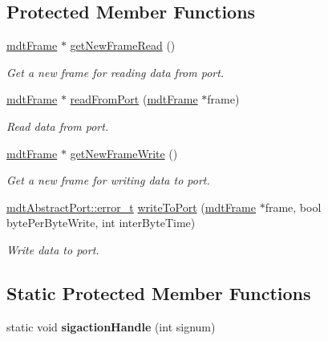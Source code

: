 \subsection*{Protected Member Functions}
\begin{DoxyCompactItemize}
\item 
\hyperlink{classmdt_frame}{mdtFrame} $\ast$ \hyperlink{classmdt_port_thread_a611211e56620ec9c699019452716e4fc}{getNewFrameRead} ()
\begin{DoxyCompactList}\small\item\em Get a new frame for reading data from port. \end{DoxyCompactList}\item 
\hyperlink{classmdt_frame}{mdtFrame} $\ast$ \hyperlink{classmdt_port_thread_a7e6e152839e35b8fbd1eb299c1d0b2fe}{readFromPort} (\hyperlink{classmdt_frame}{mdtFrame} $\ast$frame)
\begin{DoxyCompactList}\small\item\em Read data from port. \end{DoxyCompactList}\item 
\hyperlink{classmdt_frame}{mdtFrame} $\ast$ \hyperlink{classmdt_port_thread_acba4fce38a633da68ec23fe191ba6105}{getNewFrameWrite} ()
\begin{DoxyCompactList}\small\item\em Get a new frame for writing data to port. \end{DoxyCompactList}\item 
\hyperlink{classmdt_abstract_port_ad4121bb930c95887e77f8bafa065a85e}{mdtAbstractPort::error\_\-t} \hyperlink{classmdt_port_thread_a9372a53561362b0c86f499b8a36805e1}{writeToPort} (\hyperlink{classmdt_frame}{mdtFrame} $\ast$frame, bool bytePerByteWrite, int interByteTime)
\begin{DoxyCompactList}\small\item\em Write data to port. \end{DoxyCompactList}\end{DoxyCompactItemize}
\subsection*{Static Protected Member Functions}
\begin{DoxyCompactItemize}
\item 
\hypertarget{classmdt_port_thread_a01d2362e0dfcece4cba242cb586d8d1c}{
static void {\bfseries sigactionHandle} (int signum)}
\label{classmdt_port_thread_a01d2362e0dfcece4cba242cb586d8d1c}

\end{DoxyCompactItemize}
